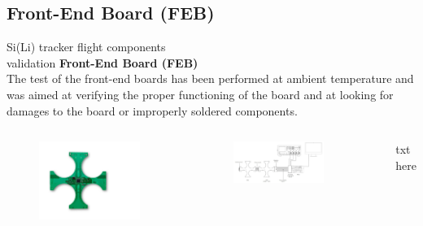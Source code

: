 \documentclass[aspectratio=169,xcolor=dvipsnames]{beamer}
\begin{document}
\subsection{Front-End Board (FEB)}
\begin{frame}{\vspace{-0.3cm}Si(Li) tracker flight components \\ \vskip-0.15cm validation}
    \fontsize{9pt}{1}\selectfont
    \vskip0.15cm
    \textbf{\large Front-End Board (FEB)} \\
    \vspace{0.15cm}
    The test of the front-end boards has been performed at ambient temperature and was aimed at verifying the proper functioning of the board and at looking for damages to the board or improperly soldered components.

    \vskip0.3cm
    \begin{columns}[T]
            \begin{figure}
                \centering
                \includegraphics[width=0.9\textwidth]{images/flight_components_validation/FEB_immagine.pdf}
            \end{figure}
        
            \begin{figure}
                \centering
                \includegraphics[width=0.8\textwidth]{images/flight_components_validation/test_setup_FEB_2.jpg}
            \end{figure}
            txt here
    \end{columns}
\end{frame}
\end{document}
